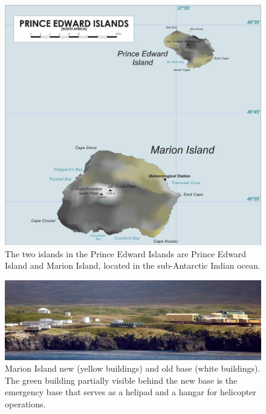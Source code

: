 \begin{figure}
	\centering
	\includegraphics[width=\linewidth]{Figures/marion}
	\caption{The two islands in the Prince Edward Islands are Prince Edward Island and Marion Island, located in the sub-Antarctic Indian ocean. }
	\label{fig:marion}
\end{figure}

\begin{figure}
	\centering
	\includegraphics[width=\linewidth]{Figures/base}
	\caption{Marion Island new (yellow buildings) and old base (white buildings). The green building partially visible behind the new base is the emergency base that serves as a helipad and a hangar for helicopter operations.}
	\label{fig:base}
\end{figure}


